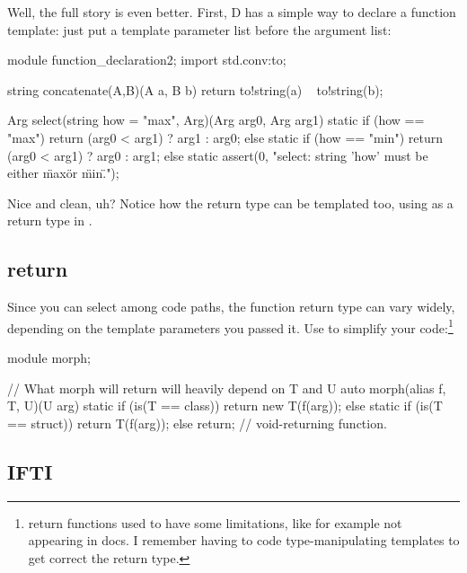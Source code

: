 Well, the full story is even better. First, D has a simple way to declare a function template: just put a template parameter list before the argument list:

\begin{dcode}
module function_declaration2;
import std.conv:to;

string concatenate(A,B)(A a, B b)
{
    return to!string(a) ~ to!string(b);
}

Arg select(string how = "max", Arg)(Arg arg0, Arg arg1)
{
    static if (how == "max")
        return (arg0 < arg1) ? arg1 : arg0;
    else static if (how == "min")
        return (arg0 < arg1) ? arg0 : arg1;
    else
        static assert(0, 
        "select: string 'how' must be either \"max\" or \"min\".");
}      
\end{dcode}

Nice and clean, uh? Notice how the return type can be templated too, using  as a return type in . 

\subsection{\texorpdfstring{ return}
                           {auto return}}
\label{autoreturn}

Since you can select among code paths, the function return type can vary widely, depending on the template parameters you passed it. Use  to simplify your code:\footnote{  return functions used to have some limitations, like for example not appearing in docs. I remember having to code type-manipulating templates to get correct the return type.}

\begin{dcode}
module morph;

// What morph will return will heavily depend on T and U
auto morph(alias f, T, U)(U arg)
{
    static if (is(T == class))
        return new T(f(arg));
    else static if (is(T == struct))
        return T(f(arg));
    else
        return; // void-returning function.    
}
\end{dcode}


\subsection{IFTI}\label{ifti}

